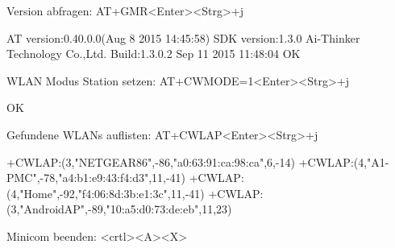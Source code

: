 \begin{console}
Version abfragen: AT+GMR<Enter><Strg>+j
\end{console}

\begin{screensmall}
AT version:0.40.0.0(Aug  8 2015 14:45:58)
SDK version:1.3.0
Ai-Thinker Technology Co.,Ltd.
Build:1.3.0.2 Sep 11 2015 11:48:04
OK
\end{screensmall}

\begin{console}
WLAN Modus Station setzen: AT+CWMODE=1<Enter><Strg>+j
\end{console}

\begin{screensmall}
OK
\end{screensmall}

\begin{console}
Gefundene WLANs auflisten: AT+CWLAP<Enter><Strg>+j
\end{console}

\begin{screensmall}
+CWLAP:(3,"NETGEAR86",-86,"a0:63:91:ca:98:ca",6,-14)
+CWLAP:(4,"A1-PMC",-78,"a4:b1:e9:43:f4:d3",11,-41)
+CWLAP:(4,"Home",-92,"f4:06:8d:3b:e1:3c",11,-41)
+CWLAP:(3,"AndroidAP",-89,"10:a5:d0:73:de:eb",11,23)
\end{screensmall}

\begin{console}
Minicom beenden: <crtl><A><X>
\end{console}
